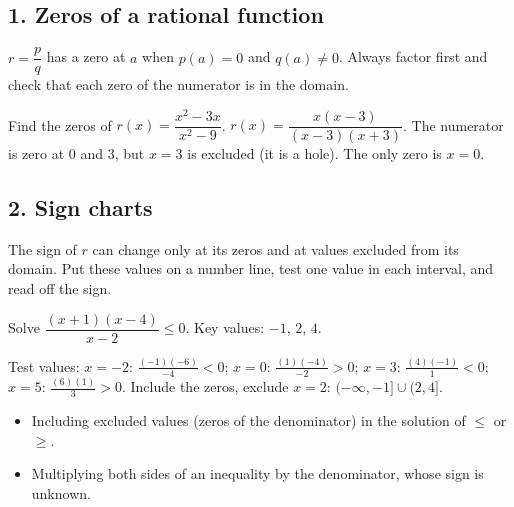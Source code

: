 \subsection*{1. Zeros of a rational function}
\begin{keyidea}
$r=\dfrac pq$ has a zero at $a$ when $p(a)=0$ and $q(a)\neq0$. Always factor first and check that each zero of the numerator is in the domain.
\end{keyidea}

\begin{example}[Example 1]
Find the zeros of $r(x)=\dfrac{x^2-3x}{x^2-9}$.
\sol $r(x)=\dfrac{x(x-3)}{(x-3)(x+3)}$. The numerator is zero at $0$ and $3$, but $x=3$ is excluded (it is a hole). The only zero is $x=0$.
\end{example}

\subsection*{2. Sign charts}
The sign of $r$ can change only at its zeros and at values excluded from its domain. Put these values on a number line, test one value in each interval, and read off the sign.

\begin{example}
Solve $\dfrac{(x+1)(x-4)}{x-2}\le0$.
\sol Key values: $-1$, $2$, $4$.
\begin{center}
\end{center}
Test values: $x=-2$: $\frac{(-1)(-6)}{-4}<0$; $x=0$: $\frac{(1)(-4)}{-2}>0$; $x=3$: $\frac{(4)(-1)}{1}<0$; $x=5$: $\frac{(6)(1)}{3}>0$. Include the zeros, exclude $x=2$: $(-\infty,-1]\cup(2,4]$.
\end{example}

\begin{mistakes}
\begin{itemize}
\item Including excluded values (zeros of the denominator) in the solution of $\le$ or $\ge$.
\item Multiplying both sides of an inequality by the denominator, whose sign is unknown.
\end{itemize}
\end{mistakes}


